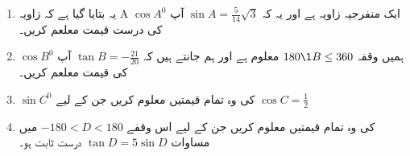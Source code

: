 \begin{enumerate}
\item
یہ بتایا گیا ہے کہ زاویہ  A  ایک منفرجیہ زاویہ ہے اور یہ کہ \(\sin A = \frac{5}{14}\sqrt{3}\) آپ \( \cos A  ^{0}\)  کی درست قیمت معلعم کریں۔
\item

ہمیں وقفہ   \(180\l B \le 360\) معلوم ہے اور ہم جانتے ہیں کہ \( \tan B=-\frac{21}{20}\)   آپ \( \cos B  ^{0}\)  کی قیمت معلعم کریں۔
\item
  \( \sin C  ^{0}\)  کی وہ تمام قیمتیں معلوم کریں جن کے لیے  \(\cos C=\frac{1}{2}\)

\item
کی وہ تمام قیمتیں معلوم کریں جن کے لیے اس وقفے  \(-180<D<180\) میں مساوات \(\tan D=5\sin D\) درست ثابت ہو۔                                                                                                                                                                                                                                                                                                                                                                                                                                                                                                                                                                                                                                                                                                                                                                                                                                                                                                                                                                                                                                                                                                                                                                                                                                                                                                                                                                                                                                                                                                                                                                                                                                                                                                                                                                                                                                                                                                                                                                                                                                                                                                                                                                                                                                                                                                                                                                                                                                                                                                                                                                              
\end{enumerate}
